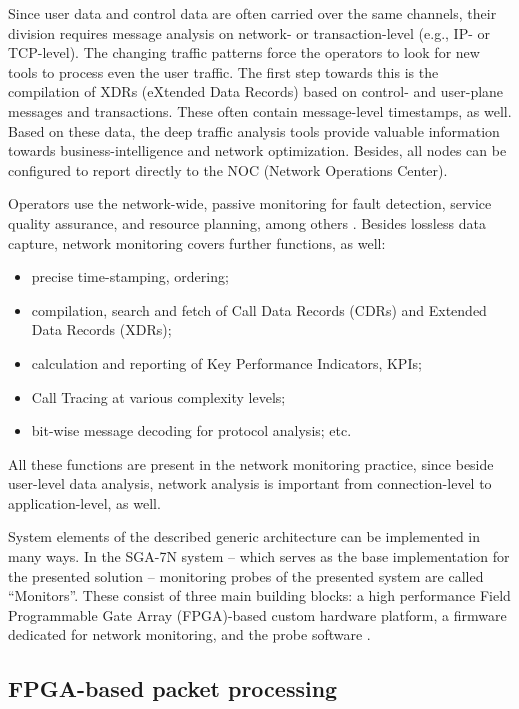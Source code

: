 \documentclass[journal]{IEEEtran}
\begin{document}
Since user data and control data are often carried over the same channels, their division requires message analysis on network- or transaction-level (e.g., IP- or TCP-level). The changing traffic patterns force the operators to look for new tools to process even the user traffic. The first step towards this is the compilation of XDRs (eXtended Data Records) based on control- and user-plane messages and transactions. These often contain message-level timestamps, as well. Based on these data, the deep traffic analysis tools provide valuable information towards business-intelligence and network optimization. Besides, all nodes can be configured to report directly to the NOC (Network Operations Center).

Operators use the network-wide, passive monitoring for fault detection, service quality assurance, and resource planning, among others \cite{LTE_monitoring}. Besides lossless data capture, network monitoring covers further functions, as well:
\begin{itemize}
\renewcommand\labelitemi{--}
\item precise time-stamping, ordering;
\item compilation, search and fetch of Call Data Records (CDRs) and Extended Data Records (XDRs);
\item calculation and reporting of Key Performance Indicators, KPIs;
\item Call Tracing at various complexity levels;
\item bit-wise message decoding for protocol analysis; etc. 
\end{itemize}

All these functions are present in the network monitoring practice, since beside user-level data analysis, network analysis is important from connection-level to application-level, as well.

System elements of the described generic architecture can be implemented in many ways. In the SGA-7N system -- which serves as the base implementation for the presented solution --  monitoring probes of the presented system are called ``Monitors''. These consist of three main building blocks: a high performance Field Programmable Gate Array (FPGA)-based custom hardware platform, a firmware dedicated for network monitoring, and the probe software \cite{AITIA_SGA7N}.

\subsection{FPGA-based packet processing}
\end{document}
